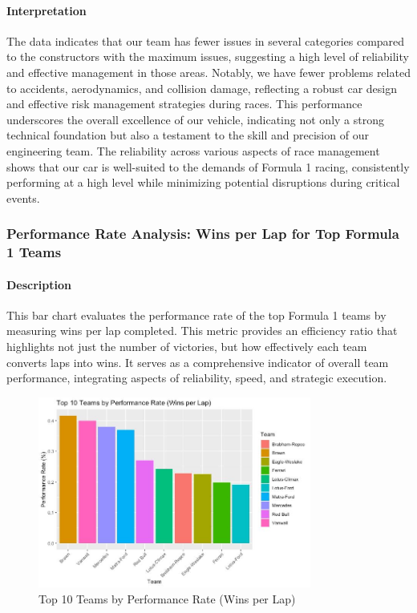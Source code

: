 \documentclass{article}
\begin{document}
\paragraph{Interpretation}
The data indicates that our team has fewer issues in several categories compared to the constructors with the maximum issues, suggesting a high level of reliability and effective management in those areas. Notably, we have fewer problems related to accidents, aerodynamics, and collision damage, reflecting a robust car design and effective risk management strategies during races. This performance underscores the overall excellence of our vehicle, indicating not only a strong technical foundation but also a testament to the skill and precision of our engineering team. The reliability across various aspects of race management shows that our car is well-suited to the demands of Formula 1 racing, consistently performing at a high level while minimizing potential disruptions during critical events.


\subsubsection{Performance Rate Analysis: Wins per Lap for Top Formula 1 Teams}

\paragraph{Description}
This bar chart evaluates the performance rate of the top Formula 1 teams by measuring wins per lap completed. This metric provides an efficiency ratio that highlights not just the number of victories, but how effectively each team converts laps into wins. It serves as a comprehensive indicator of overall team performance, integrating aspects of reliability, speed, and strategic execution.

\begin{figure}[H]
    \centering
    \includegraphics[width=0.8\textwidth]{images/querie/laps-vs-wins.jpeg}
    \caption{Top 10 Teams by Performance Rate (Wins per Lap)}
\end{figure}
\end{document}
